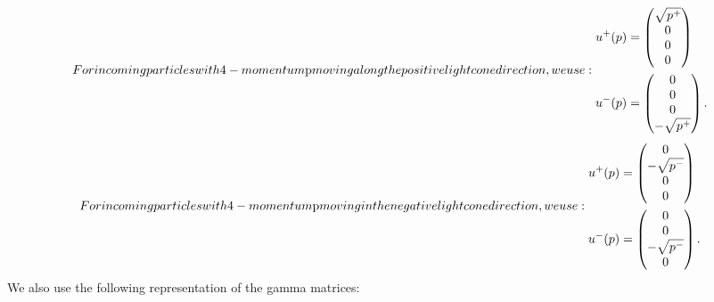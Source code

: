 \begin{subequations}
For incoming particles with 4-momentum $p$ moving along the positive light cone direction, we use: 
\begin{align}
u^+(p) &= 
 \begin{pmatrix}
  \sqrt{p^+} \\
  0\\
  0 \\
  0
 \end{pmatrix}\\
 u^-(p) &= 
 \begin{pmatrix}
  0 \\
  0 \\
  0 \\
  -\sqrt{p^+}
 \end{pmatrix}.
\end{align}
\end{subequations}
\begin{subequations}
For incoming particles with 4-momentum $p$ moving in the negative light cone direction, we use:
\begin{align}
u^+(p) &= 
 \begin{pmatrix}
  0 \\
  -\sqrt{p^-}\\
  0 \\
  0
 \end{pmatrix}\\
 u^-(p) &= 
 \begin{pmatrix}
  0 \\
  0 \\
  -\sqrt{p^-} \\
  0
 \end{pmatrix}.
\end{align}
\end{subequations}
We also use the following representation of the gamma matrices:
